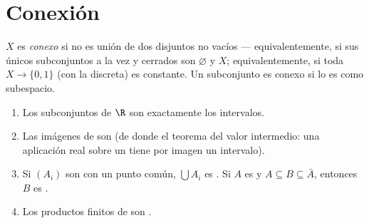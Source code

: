 \section{Conexión}

\begin{definition}\label{def:b3:topology:connected}
$X$ es \emph{conexo} si no es unión de dos
 disjuntos no vacíos ---
equivalentemente, si sus únicos subconjuntos a la vez  y
cerrados son $\varnothing$ y $X$; equivalentemente, si toda
$X \to \{0, 1\}$ (con la  discreta) es constante. Un
subconjunto es conexo si lo es como subespacio.
\end{definition}

\begin{theorem}\label{thm:b3:topology:connectedbasics}
\begin{enumerate}
  \item Los subconjuntos  de
  $\R$ son exactamente los intervalos. \item Las imágenes
   de
   son
   (de donde el teorema del
  valor intermedio: una aplicación real
   sobre un
   tiene por imagen un
  intervalo). \item Si $(A_i)$ son
   con un punto común,
  $\bigcup
        A_i$ es . Si $A$ es
   y $A \subseteq
        B \subseteq \bar A$, entonces $B$ es
  . \item Los productos
  finitos de  son
  .
\end{enumerate}
\end{theorem}

